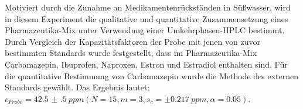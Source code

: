 Motiviert durch die Zunahme an Medikamentenrückständen in Süßwasser, wird in diesem Experiment die qualitative und quantitative Zusammensetzung eines Pharmazeutika-Mix unter Verwendung einer Umkehrphasen-HPLC bestimmt. Durch Vergleich der Kapazitätsfaktoren der Probe mit jenen von zuvor bestimmten Standards wurde festgestellt, dass im Pharmazeutika-Mix Carbamazepin, Ibuprofen, Naproxen, Estron und Estradiol enthalten sind. Für die quantitative Bestimmung von Carbamazepin wurde die Methode des externen Standards gewählt. Das Ergebnis lautet: $c_{Probe} = \SI[mode=text, multi-part-units = brackets, separate-uncertainty]{42.5(5)}{ppm} \left(N = 15, m = 3, s_c = \pm \SI[mode=text]{0.217}{ppm}, \alpha = 0.05\right)$.
